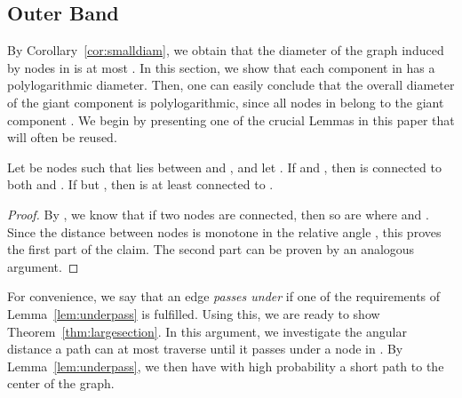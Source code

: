 \documentclass{llncs}
\newcommand{\thmref}[1]{Theorem~\ref{thm:#1}}
\newcommand{\lemref}[1]{Lemma~\ref{lem:#1}}
\newcommand{\corref}[1]{Corollary~\ref{cor:#1}}
\begin{document}
\subsection{Outer Band}
\label{sec:outer}

By \corref{smalldiam}, we obtain that the diameter of the graph induced by nodes in  is at most . In this section, we show that each component in  has a polylogarithmic diameter. Then, one can easily conclude that the overall diameter of the giant component is polylogarithmic, since all nodes in  belong to the giant component \cite{bfmconnected}.
We begin by presenting one of the crucial Lemmas in this paper that will often be reused. 
\begin{lemma}
\label{lem:underpass}
Let  be nodes such that  lies between  and , and let . If  and , then  is connected to both  and . If  but , then  is at least connected to . 
\end{lemma}
\begin{proof}
By \cite[Lemma 5.28]{bfmconnected}, we know that if two nodes  are connected, then so are  where  and . Since the distance between nodes is monotone in the relative angle , this proves the first part of the claim. The second part can be proven by an analogous argument.
\end{proof}
For convenience, we say that an edge  {\em passes under}  if one of the requirements of \lemref{underpass} is fulfilled. Using this, we are ready to show \thmref{largesection}. In this argument, we investigate the angular distance a path can at most traverse until it passes under a node in . By \lemref{underpass}, we then have with high probability a short path to the center  of the graph.
\end{document}
